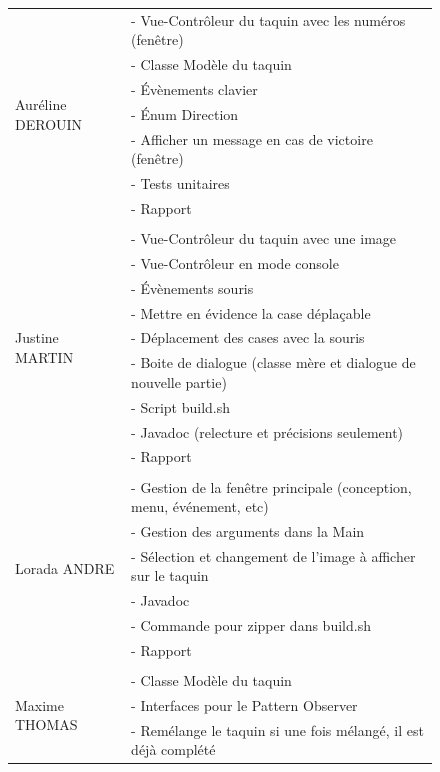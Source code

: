 		\begin{figure}[H]
			\begin{center}
				\begin{tabular}{l l}
				\multirow{7}{4em}{Auréline DEROUIN}
					& - Vue-Contrôleur du taquin avec les numéros (fenêtre)\\
					& - Classe Modèle du taquin\\
					& - Évènements clavier\\
					& - Énum Direction\\
					& - Afficher un message en cas de victoire (fenêtre)\\
					& - Tests unitaires\\
					& - Rapport\\
				 & \\

				\multirow{9}{4em}{Justine MARTIN}
					& - Vue-Contrôleur du taquin avec une image\\
					& - Vue-Contrôleur en mode console\\
					& - Évènements souris\\
					& - Mettre en évidence la case déplaçable\\
					& - Déplacement des cases avec la souris\\
					& - Boite de dialogue (classe mère et dialogue de nouvelle partie)\\
					& - Script build.sh\\
					& - Javadoc (relecture et précisions seulement)\\
					& - Rapport\\
				 & \\

				\multirow{6}{4em}{Lorada ANDRE}
					& - Gestion de la fenêtre principale (conception, menu, événement, etc)\\
					& - Gestion des arguments dans la Main\\
					& - Sélection et changement de l'image à afficher sur le taquin\\
					& - Javadoc\\
					& - Commande pour zipper dans build.sh\\
					& - Rapport\\
				 & \\

				\multirow{3}{4em}{Maxime THOMAS}
					& - Classe Modèle du taquin\\
					& - Interfaces pour le Pattern Observer\\
					& - Remélange le taquin si une fois mélangé, il est déjà complété\\

				\end{tabular}
			\end{center}
		\end{figure}
